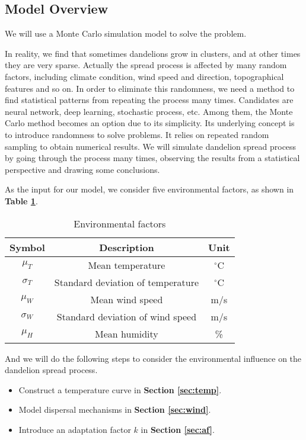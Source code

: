 \documentclass[12pt]{article}
\begin{document}
	
	

	
	\subsection{Model Overview}
		
		We will use a Monte Carlo simulation model to solve the problem.
		
		In reality, we find that sometimes dandelions grow in clusters, and at other times they are very sparse. Actually the spread process is affected by many random factors, including climate condition, wind speed and direction, topographical features and so on.  In order to eliminate this randomness, we need a method to find statistical patterns from repeating the process many times.  Candidates are neural network, deep learning, stochastic process, etc.  Among them, the Monte Carlo method becomes an option due to its simplicity.  Its underlying concept is to introduce randomness to solve problems.   It relies on repeated random sampling to obtain numerical results.  We will simulate dandelion spread process by going through the process many times, observing the results from a statistical perspective and drawing some conclusions.
		
		As the input for our model, we consider five environmental factors, as shown in \textbf{Table \ref{tb:vars}}.  
		
		{
			\fontsize{10}{14}\selectfont
			{
				\begin{longtable}{ccc}
					\caption{Environmental factors}
					\label{tb:vars}\\
					\toprule
					Symbol&Description&Unit\\
					\toprule
					$\mu_T$&Mean temperature&$^\circ$C\\
					$\sigma_T$&Standard deviation of temperature&$^\circ$C\\
					$\mu_W$&Mean wind speed&m/s\\
					$\sigma_W$&Standard deviation of wind speed&m/s\\
					$\mu_H$&Mean humidity&\%\\
					\bottomrule
				\end{longtable}
			}
		}
		
		And we will do the following steps to consider the environmental influence on the dandelion spread process.
		
		\begin{itemize}
			\vspace{-0.5cm}
			\item Construct a temperature curve in \textbf{Section \ref{sec:temp}}.  
			
			\vspace{-0.2cm}
			\item Model dispersal mechanisms in \textbf{Section \ref{sec:wind}}.
			
			\vspace{-0.2cm}
			\item Introduce an adaptation factor $k$ in \textbf{Section \ref{sec:af}}.  
		
		\end{itemize}
	
\end{document}
